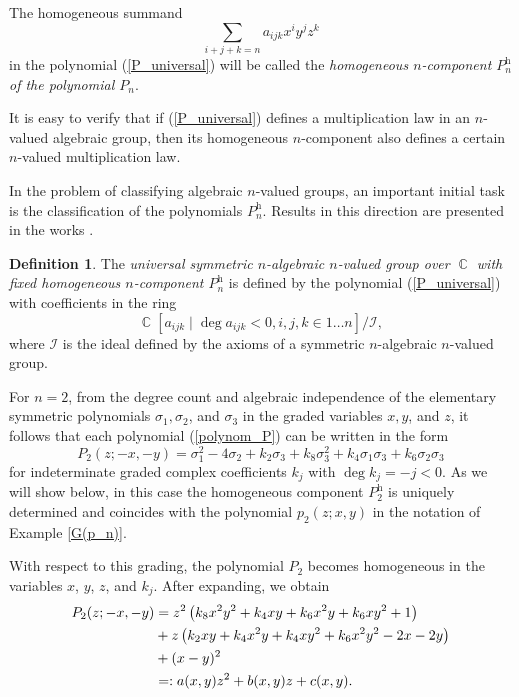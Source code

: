 \documentclass[14pt, dvipsnames]{extarticle}
\theoremstyle{definition}
\theoremstyle{definition}
\newtheorem{defi}{Definition}
\theoremstyle{remark}
\DeclareMathOperator{\Cc}{\mathbb{C}}
\DeclareMathOperator{\h}{\mathrm{h}}
\begin{document}
The homogeneous summand
$$\sum\limits_{i+j+k = n}a_{ijk}x^iy^jz^k$$
in the polynomial (\ref{P_universal}) will be called the {\it homogeneous $n$-component $P_n^{\h}$ of the polynomial $P_n$}.

It is easy to verify that if (\ref{P_universal}) defines a multiplication law in an $n$-valued algebraic group, then its homogeneous $n$-component also defines a certain $n$-valued multiplication law.

In the problem of classifying algebraic $n$-valued groups, an important initial task is the classification of the polynomials $P_n^{\h}$. Results in this direction are presented in the works \cite{Buchstaber75, Kholodov81, Kholodov84}.

\begin{defi}
The {\it universal symmetric $n$-algebraic $n$-valued group over $\Cc$ with fixed homogeneous $n$-component $P_n^{\h}$} is defined by the polynomial (\ref{P_universal}) with coefficients in the ring
$$\Cc[a_{ijk}\mid \deg a_{ijk} < 0, i, j, k \in {1\dots n}]/\mathcal{I},$$
where $\mathcal{I}$ is the ideal defined by the axioms of a symmetric $n$-algebraic $n$-valued group.
\end{defi}

For $n = 2$, from the degree count and algebraic independence of the elementary symmetric polynomials $\sigma_1, \sigma_2$, and $\sigma_3$ in the graded variables $x, y$, and $z$, it follows that each polynomial (\ref{polynom_P}) can be written in the form
\begin{equation}\label{P_2_universal}
P_2(z; -x, -y) = \sigma_1^2 - 4\sigma_2 + k_2\sigma_3 + k_8\sigma_3^2 + k_4\sigma_1\sigma_3 + k_6\sigma_2\sigma_3
\end{equation}
for indeterminate graded complex coefficients $k_j$ with $\deg k_j = -j < 0$. As we will show below, in this case the homogeneous component $P_2^{\h}$ is uniquely determined and coincides with the polynomial $p_2(z; x, y)$ in the notation of Example \ref{G(p_n)}.

With respect to this grading, the polynomial $P_2$ becomes homogeneous in the variables $x$, $y$, $z$, and $k_j$. After expanding, we obtain
\begin{align}
P_2(z; -x, -y) &= z^2 \left(k_8 x^2 y^2+k_4 x y+k_6 x^2 y+k_6 x y^2+1\right) \notag \\
&+ z \left(k_2 x y+k_4x^2 y+k_4 x y^2+k_6 x^2 y^2-2 x-2 y\right) \notag \\
&+ (x - y)^2\notag \\
&=: a(x, y)z^2 + b(x, y)z + c(x, y).\label{P_2_a_b_c}
\end{align}
\end{document}
